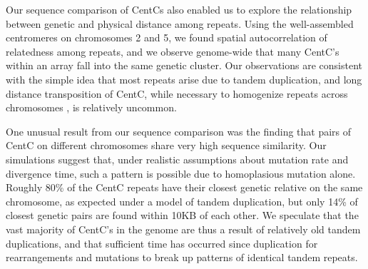 
Our sequence comparison of CentCs also enabled us to explore the relationship between genetic and physical distance among repeats.  
Using the well-assembled centromeres on chromosomes 2 and 5, we found spatial autocorrelation of relatedness among repeats, and we observe genome-wide that many CentC’s within an array fall into the same genetic cluster.  
Our observations are consistent with the simple idea that most repeats arise due to tandem duplication, and long distance transposition of CentC, while necessary to homogenize repeats across chromosomes \citep{Shi2010}, is relatively uncommon.

One unusual result from our sequence comparison was the finding that pairs of CentC on different chromosomes share very high sequence similarity.  
Our simulations suggest that, under realistic assumptions about mutation rate and divergence time, such a pattern is possible due to homoplasious mutation alone.  
Roughly 80\% of the CentC repeats have their closest genetic relative on the same chromosome, as expected under a model of tandem duplication, but only 14\% of closest genetic pairs are found within 10KB of each other.
We speculate that the vast majority of  CentC’s in the genome are thus a result of relatively old tandem duplications, and that sufficient time has occurred since duplication for rearrangements and mutations to break up patterns of identical tandem repeats.
 




